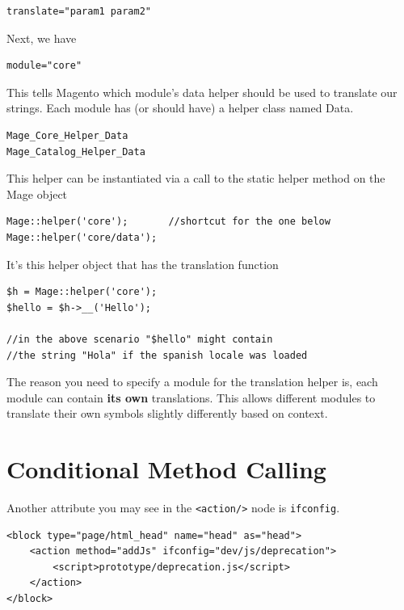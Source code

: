 \documentclass[oneside]{book}
\begin{document}
\begin{lstlisting}
translate="param1 param2"

\end{lstlisting}


Next, we have

\begin{lstlisting}
module="core"

\end{lstlisting}


This tells Magento which module's data helper should be used to translate our strings.  Each module has (or should have) a helper class named Data.

\begin{lstlisting}
Mage_Core_Helper_Data
Mage_Catalog_Helper_Data

\end{lstlisting}


This helper can be instantiated via a call to the static helper method on the Mage object

\begin{lstlisting}
Mage::helper('core');       //shortcut for the one below
Mage::helper('core/data');

\end{lstlisting}


It's this helper object that has the translation function

\begin{lstlisting}
$h = Mage::helper('core');
$hello = $h->__('Hello');

//in the above scenario "$hello" might contain
//the string "Hola" if the spanish locale was loaded

\end{lstlisting}


The reason you need to specify a module for the translation helper is, each module can contain \textbf{its own} translations.  This allows different modules to translate their own symbols slightly differently based on context.

\section{Conditional Method Calling}

Another attribute you may see in the \footnotesize\texttt{\textless action/\textgreater } \normalsize  node is \footnotesize\texttt{ifconfig}\normalsize.

\begin{lstlisting}
<block type="page/html_head" name="head" as="head">
    <action method="addJs" ifconfig="dev/js/deprecation">
        <script>prototype/deprecation.js</script>
    </action>
</block>

\end{lstlisting}
\end{document}
